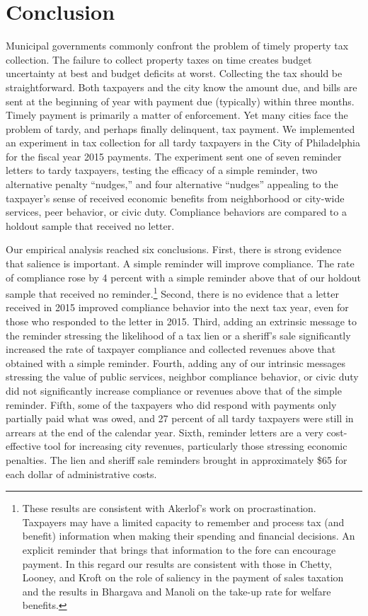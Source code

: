 \documentclass[12pt]{article}
\begin{document}
\section{Conclusion}

Municipal governments commonly confront the problem of timely property
tax collection.  The failure to collect property taxes on time creates
budget uncertainty at best and budget deficits at worst.  Collecting
the tax should be straightforward.  Both taxpayers and the city know
the amount due, and bills are sent at the beginning of year with
payment due (typically) within three months. Timely payment is
primarily a matter of enforcement.  Yet many cities face the problem
of tardy, and perhaps finally delinquent, tax payment.  We implemented
an experiment in tax collection for all tardy
taxpayers in the City of Philadelphia for the fiscal year 2015
payments.  The experiment sent one of seven reminder letters to tardy
taxpayers, testing the efficacy of a simple reminder, two alternative
penalty ``nudges,'' and four alternative ``nudges'' appealing to the
taxpayer's sense of received economic benefits from neighborhood or
city-wide services, peer behavior, or civic duty. Compliance behaviors
are compared to a holdout sample that received no letter.

Our empirical analysis reached six conclusions.  First, there is
strong evidence that salience is important.  A simple reminder will
improve compliance.  The rate of compliance rose by 4 percent with a
simple reminder above that of our holdout sample that received no
reminder.\footnote{These results are consistent with Akerlof's
  \citeyear{Akerlof-91} work on procrastination.  Taxpayers may have a
  limited capacity to remember and process tax (and benefit)
  information when making their spending and financial decisions.  An
  explicit reminder that brings that information to the fore can
  encourage payment.  In this regard our results are consistent with
  those in Chetty, Looney, and Kroft \citeyear{chetty2009salience} on
  the role of saliency in the payment of sales taxation and the
  results in Bhargava and Manoli \citeyear{Bhargava-15} on the take-up
  rate for welfare benefits.} Second, there is no evidence that a letter
  received in 2015 improved compliance behavior into the next
  tax year, even for those who responded to the letter in 2015.
Third, adding an extrinsic message to the reminder stressing the likelihood of a tax
lien or a sheriff's sale significantly increased the rate of taxpayer compliance and
collected revenues above that obtained with a simple reminder. Fourth, adding any of
our intrinsic messages stressing the value of public services, neighbor compliance behavior,
or civic duty did not significantly increase compliance or revenues above that of the simple
reminder. Fifth, some of the taxpayers who did respond with payments only partially paid
what was owed, and 27 percent of all tardy taxpayers were still in arrears at the end of the
calendar year. Sixth, reminder letters are a very cost-effective tool for increasing city revenues,
particularly those stressing economic penalties. The lien and sheriff sale
reminders brought in approximately \$65 for each dollar of administrative costs.
\end{document}
